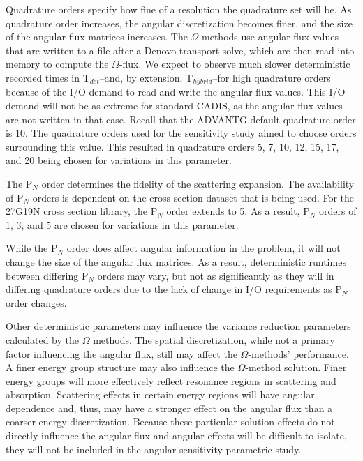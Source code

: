 Quadrature orders specify
how fine of a resolution the quadrature set will be. As quadrature order
increases, the angular discretization becomes finer, and the
size of the angular flux matrices increases. The $\Omega$ methods use angular
flux values that are written to a file after a Denovo transport solve, which are
then read into memory to compute the $\Omega$-flux. We expect to
observe much slower deterministic recorded times in T$_{det}$--and, by
extension, T$_{hybrid}$--for high quadrature orders
because of the I/O demand to read and write the angular flux values. This I/O
demand will not be as extreme for standard CADIS, as the angular flux values are
not written in that case.
Recall that the ADVANTG
default quadrature order is 10. The quadrature orders used for the sensitivity
study aimed to choose orders surrounding this value. This resulted in quadrature
orders 5, 7, 10, 12, 15, 17, and 20 being chosen for variations in this
parameter.

The P$_N$ order determines the fidelity of the scattering expansion. The
availability of P$_N$ orders is dependent on the cross section dataset that is
being used. For the
27G19N cross section library, the P$_N$ order extends to 5. As a result,
P$_N$ orders of 1, 3, and 5 are chosen for variations in this parameter.

While the P$_N$ order
does affect angular information in the problem, it will not change the size of
the angular flux matrices. As a result, deterministic runtimes between
differing P$_N$ orders
may vary, but not as significantly as they will in differing quadrature orders
due to the lack of change in I/O requirements as P$_N$ order changes.

Other deterministic parameters may influence the variance reduction parameters
calculated by the $\Omega$ methods.
The spatial discretization, while not a primary factor influencing
the angular flux, still may affect the $\Omega$-methods' performance.
A finer energy group structure may also influence the $\Omega$-method solution.
Finer energy groups will more effectively reflect resonance regions in
scattering and absorption. Scattering effects in certain energy regions will
have angular dependence and, thus, may have a stronger effect on the angular flux
than a coarser energy discretization. Because these particular solution effects
do not directly influence the angular flux and angular effects will be difficult
to isolate, they will not be included
in the angular sensitivity parametric study.


